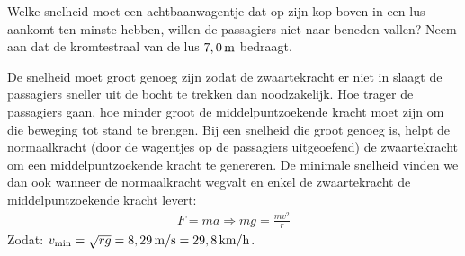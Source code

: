 
\begin{exercise}

 
\begin{minipage}[t]{0.5\textwidth}
Welke snelheid moet een achtbaanwagentje dat op zijn kop boven in een lus aankomt ten minste hebben, willen de passagiers niet naar beneden vallen? Neem aan dat de kromtestraal van de lus $7,0\rm\,m$ bedraagt.
\end{minipage}
\hspace{5mm}
\begin{minipage}[t]{0.45\textwidth}
\end{minipage}
\begin{oplossing}
De snelheid moet groot genoeg zijn zodat de zwaartekracht er niet in slaagt de passagiers sneller uit de bocht te trekken dan noodzakelijk. Hoe trager de passagiers gaan, hoe minder groot de middelpuntzoekende kracht moet zijn om die beweging tot stand te brengen. 
\newline
Bij een snelheid die groot genoeg is, helpt de normaalkracht (door de wagentjes op de passagiers uitgeoefend) de zwaartekracht om een middelpuntzoekende kracht te genereren. De minimale snelheid vinden we dan ook wanneer de normaalkracht wegvalt en enkel de zwaartekracht de middelpuntzoekende kracht levert:
\begin{eqnarray*}
		F=ma\Rightarrow mg=\frac{mv^2}{r}
\end{eqnarray*}
Zodat:
$v_{\rm min}=\sqrt{rg}=8,29\rm\,m/s=29,8\rm\,km/h$.
\end{oplossing}

\end{exercise}
